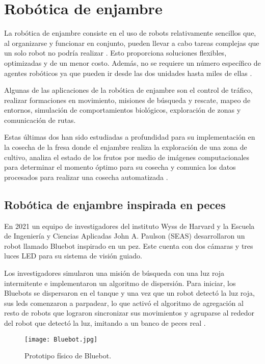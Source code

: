 \section{Robótica de enjambre}
La robótica de enjambre consiste en el uso de robots relativamente sencillos que, al organizarse y funcionar en conjunto, pueden llevar a cabo tareas complejas que un solo robot no podría realizar \cite{robotica_enjambre2}. Esto proporciona soluciones flexibles, optimizadas y de un menor costo. Además, no se requiere un número específico de agentes robóticos ya que pueden ir desde las dos unidades hasta miles de ellas \cite{UNIDIRswarm}.

Algunas de las aplicaciones de la robótica de enjambre son el control de tráfico, realizar formaciones en movimiento, misiones de búsqueda y rescate, mapeo de entornos, simulación de comportamientos biológicos, exploración de zonas y comunicación de rutas. 

Estas últimas dos han sido estudiadas a profundidad para su implementación en la cosecha de la fresa donde el enjambre realiza la exploración de una zona de cultivo, analiza el estado de los frutos por medio de imágenes computacionales para determinar el momento óptimo para su cosecha y comunica los datos procesados para realizar una cosecha automatizada \cite{EnjambresCultivos}.

\subsection{Robótica de enjambre inspirada en peces}
En 2021 un equipo de investigadores del instituto Wyss de Harvard y la Escuela de Ingeniería y Ciencias Aplicadas John A. Paulson (SEAS) desarrollaron un robot llamado Bluebot inspirado en un pez. Este cuenta con dos cámaras y tres luces LED para su sistema de visión guiado. 

Los investigadores simularon una misión de búsqueda con una luz roja intermitente e implementaron un algoritmo de dispersión. Para iniciar, los Bluebots se dispersaron en el tanque y una vez que un robot detectó la luz roja, sus leds comenzaron a parpadear, lo que activó el algoritmo de agregación al resto de robots que lograron sincronizar sus movimientos y agruparse al rededor del robot que detectó la luz, imitando a un banco de peces real \cite{Bluebot}.

\begin{figure}[H]
	\centering
	\texttt{[image: Bluebot.jpg]}
	\caption{Prototipo físico de Bluebot\cite{Bluebot}.}
	\label{fig:bluebot}
\end{figure}

